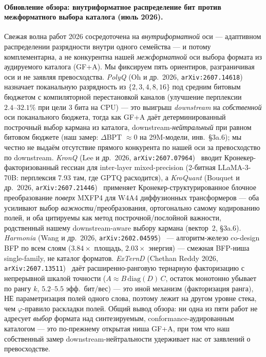 \documentclass[11pt,a4paper]{article}
\theoremstyle{plain}
\begin{document}
\paragraph{Обновление обзора: внутриформатное распределение бит против межформатного выбора каталога (июль 2026).}
Свежая волна работ 2026 сосредоточена на \emph{внутриформатной} оси ---
адаптивном распределении разрядности внутри одного семейства ---
и потому комплементарна, а не конкурентна нашей \emph{межформатной}
оси выбора формата из аудируемого каталога (GF+A). Мы фиксируем
пять ориентиров, разграничивая оси и не заявляя превосходства.
\emph{PolyQ} (Oh и др.\ 2026,
\texttt{arXiv:2607.14618})~\cite{polyq2026} назначает поканальную
разрядность из \(\{2,3,4,8,16\}\) под средним битовым бюджетом с
компиляторной перестановкой каналов (улучшение перплексии
\(2.4\text{--}32.1\%\) при цели 3 бита на CPU) --- это выигрыш
\emph{downstream} на \emph{собственной} оси поканального бюджета,
тогда как GF+A даёт детерминированный построчный выбор кармана из
каталога, downstream-\emph{нейтральный} при равном битовом бюджете
(наш замер: \(\Delta\)BPT \(\approx 0\) на 29M-модели, инв.~\S3a.6);
мы честно не выдаём отсутствие прямого конкурента по нашей оси за
превосходство по downstream. \emph{KronQ} (Lee и др.\ 2026,
\texttt{arXiv:2607.07964})~\cite{kronq2026} вводит
Кронекер-факторизованный гессиан для inter-layer mixed-precision
(2-битная LLaMA-3-70B: перплексия 7.93 там, где GPTQ расходится),
а \emph{KroQuant} (Bouquet и др.\ 2026,
\texttt{arXiv:2607.21446})~\cite{kroquant2026} применяет
Кронекер-структурированное блочное преобразование \emph{поверх}
MXFP4 для W4A4 диффузионных трансформеров --- оба усиливают
выбор \emph{важности}/преобразования, ортогонально самому кодированию
полей, и оба цитируемы как метод построчной/послойной важности,
родственный нашему downstream-aware выбору кармана (вектор~2, \S3a.6).
\emph{Harmonia} (Wang и др.\ 2026,
\texttt{arXiv:2602.04595})~\cite{harmonia2026} --- алгоритм-железо
co-design BFP по всем слоям (\(3.84\times\) площадь, \(2.03\times\)
энергия) --- смежная BFP-ниша single-family, не каталог форматов.
\emph{ExTernD} (Chethan Reddy 2026,
\texttt{arXiv:2607.13511})~\cite{externd2026} даёт расширенно-ранговую
тернарную факторизацию с непрерывной шкалой точности
(\(A \approx B\,\mathrm{diag}(D)\,C\), остаток монотонно убывает по
рангу \(k\), \(5.2\text{--}5.5\) эфф.\ бит/вес) --- это иной механизм
(факторизация ранга), НЕ параметризация полей одного слова, поэтому
лежит на другом уровне стека, чем \(\varphi\)-правило раскладки полей.
Общий вывод обзора: ни одна из пяти работ не адресует \emph{выбор}
формата над синтезируемым, conformance-аудированным каталогом ---
это по-прежнему открытая ниша GF+A, при том что наш собственный
замер downstream-нейтральности удерживает нас от заявлений о
превосходстве.
\end{document}
